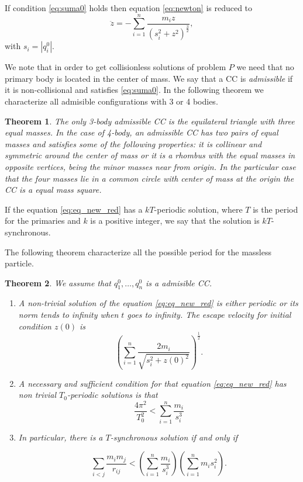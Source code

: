\documentclass[twoside]{article}
\newtheorem{thm}{Theorem}[section]
\theoremstyle{remark}
\begin{document}
If condition \eqref{eq:suma0} holds then equation \eqref{eq:newton} is reduced to
\begin{equation}\label{eq:eq_new_red}
 \ddot{z}=-\sum_{i=1 }^n\frac{m_iz}{(s_i^2+z^2)^{\frac32}},
\end{equation}
with  $s_i=|q_i^0|$.




We note that in order to get collisionless solutions of problem $P$ we need that no primary body is located in the center of mass. We say that a
CC is \emph{admissible} if it is non-collisional and satisfies \eqref{eq:suma0}. In the following theorem we characterize all admisible configurations with 3 or 4 bodies.

\begin{thm}\label{thm:caracterizacion}
The only 3-body admissible CC is the equilateral triangle with three equal masses. In the case of 4-body, an admissible CC  has two pairs of equal masses and satisfies some of the following properties: it is collinear and symmetric around the center of mass or it is a rhombus with the equal masses in opposite vertices, being the minor masses near from origin. In the particular case that the four masses  lie in a common circle with center of mass at the origin the CC is a  equal mass square.
\end{thm}

If the equation \eqref{eq:eq_new_red} has a $kT$-periodic solution, where $T$ is the period for the primaries and $k$ is a positive integer, we say that the solution is  $kT$-synchronous.

The following theorem characterize all the possible period for the massless particle.

\begin{thm}\label{thm:prin_ine} We assume that $q_1^0,\ldots,q_n^0$ is a admisible CC.
\begin{enumerate}
 \item A non-trivial solution of the equation \eqref{eq:eq_new_red} is either periodic or  its norm tends to infinity when $t$ goes to infinity. The escape velocity for initial condition $z(0)$ is \[\left(\sum_{i=1}^{n}\frac{2m_i}{\sqrt{s_i^2+z(0)^2}}\right)^{\frac12}.\]
 \item A necessary and sufficient condition for that equation \eqref{eq:eq_new_red} has non trivial $T_0$-periodic solutions is that
\begin{equation}
 \frac{4\pi^2}{T_0^2}<\sum_{i=1}^n\frac{m_i}{s_i^3}
\end{equation}
\item In particular, there is a $T$-synchronous solution if and only if

\begin{equation}\label{eq:ine_prin}
 \sum_{i<j}\frac{m_im_j}{r_{ij}}<\left(\sum_{i=1}^n\frac{m_i}{s_i^3}\right)\left(\sum_{i=1}^nm_is_i^2\right).
\end{equation}
\end{enumerate}

\end{thm}
\end{document}
